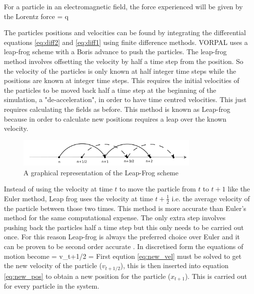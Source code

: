 For a particle in an electromagnetic field, the force experienced will be given by the Lorentz force
\be
{} = q
\ee





The particles positions and velocities can be found by integrating the differential equations \eqref{eq:diff2} and \eqref{eq:diff1} using finite difference methods. VORPAL uses a leap-frog scheme with a Boris advance to push the particles. 
The leap-frog method involves offsetting the velocity by half a time step from the position. So the velocity of the particles is only known at half integer time steps while the positions are known at integer time steps. This requires the initial velocities of the particles to be moved back half a time step at the beginning of the simulation, a "de-acceleration", in order to have time centred velocities. This just requires calculating the fields as before. This method is known as Leap-frog because in order to calculate new positions requires a leap over the known velocity. 

\begin{figure}[H]
\centering
\includegraphics[width=0.8\textwidth]{Leapfrog}
\caption{A graphical representation of the Leap-Frog scheme\cite{shape}}
\label{fig:Leapfrog}
\end{figure}
Instead of using the velocity at time $t$ to move the particle from $t$ to $t+1$ like the Euler method, Leap frog uses the velocity at time $t+\frac{1}{2}$ i.e. the average velocity of the particle between those two times. This method is more accurate than Euler's method for the same computational expense. The only extra step involves pushing back the particles half a time step but this only needs to be carried out once. For this reason Leap-frog is always the preferred choice over Euler and it can be proven to be second order accurate \cite{second_order}.
In discretised form the equations of motion become
\be 
{} = v_{t+1/2}
\label{eq:new_pos}
\ee
\be
{} = 
\label{eq:new_vel}
\ee 
First eqution \ref{eq:new_vel} must be solved to get the new velocity of the particle ($v_{t+1/2}$), this is then inserted into equation \ref{eq:new_pos} to obtain a new position for the particle ($x_{t+1}$). This is carried out for every particle in the system. 



